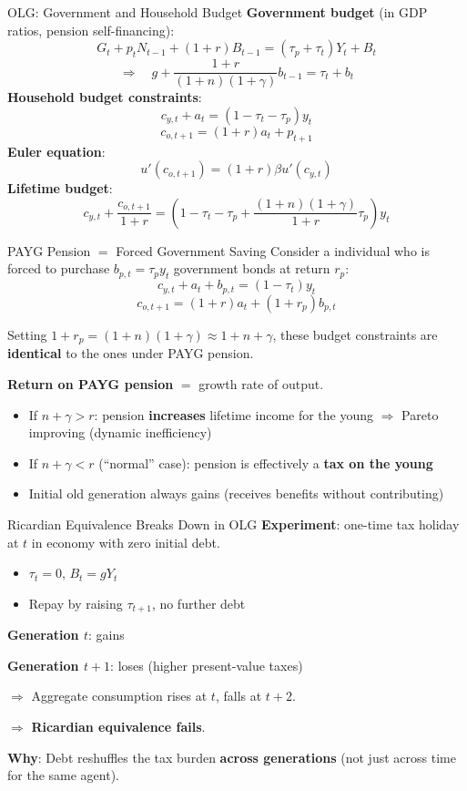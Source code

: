 \documentclass[blue]{beamer}
\begin{document}
\begin{frame}{OLG: Government and Household Budget}
	\textbf{Government budget} (in GDP ratios, pension self-financing):
	$$
	G_t+p_tN_{t-1}+(1+r)B_{t-1}=(\tau_p+\tau_t)Y_t+B_t
	$$
	\[
	\Rightarrow\quad g + \frac{1+r}{(1+n)(1+\gamma)} b_{t-1} = \tau_t + b_t
	\]
	\textbf{Household budget constraints}:
	$$
		c_{y,t} + a_t= (1-\tau_t - \tau_p) y_t 
		$$
		$$
		c_{o,t+1}=(1+r) a_t + p_{t+1}
	$$
	\textbf{Euler equation}:
	\[
	u'(c_{o,t+1}) = (1+r) \beta u'(c_{y,t})
	\]
	\textbf{Lifetime budget}:
	\[
	c_{y,t} + \frac{c_{o,t+1}}{1+r} = \left(1 - \tau_t - \tau_p + \frac{(1+n)(1+\gamma)}{1+r}\tau_p\right) y_t
	\]
\end{frame}


\begin{frame}{PAYG Pension $=$ Forced Government Saving}
	Consider a individual who is forced to purchase $b_{p,t} = \tau_p y_t$ government bonds at return $r_p$:
	$$
		c_{y,t} + a_t + b_{p,t} = (1-\tau_t) y_t 
		$$
		$$
		c_{o,t+1} = (1+r) a_t + (1+r_p) b_{p,t}
	$$
	
	Setting $1+r_p = (1+n)(1+\gamma) \approx 1+n+\gamma$, these budget constraints are \textbf{identical} to the ones under PAYG pension.
	
	\textbf{Return on PAYG pension} $=$ growth rate of output.
	\begin{itemize}
		\item If $n + \gamma > r$: pension \textbf{increases} lifetime income for the young $\Rightarrow$ Pareto improving (dynamic inefficiency)
		\item If $n + \gamma < r$ (``normal'' case): pension is effectively a \textbf{tax on the young}
		\item Initial old generation always gains (receives benefits without contributing)
	\end{itemize}
\end{frame}

\begin{frame}{Ricardian Equivalence Breaks Down in OLG}
	\textbf{Experiment}: one-time tax holiday at $t$ in economy with zero initial debt.
	\begin{itemize}
		\item $\tau_t = 0$, $B_t = gY_t$
		\item Repay by raising $\tau_{t+1}$, no further debt
	\end{itemize}
	
	\bigskip
	\textbf{Generation $t$}: gains
	
	\textbf{Generation $t+1$}: loses (higher present-value taxes)
	
	\bigskip
	$\Rightarrow$ Aggregate consumption rises at $t$, falls at $t+2$.
	
	$\Rightarrow$ \textbf{Ricardian equivalence fails}.
	
	\bigskip
	\textbf{Why}: Debt reshuffles the tax burden \textbf{across generations} (not just across time for the same agent). 
\end{frame}
\end{document}
